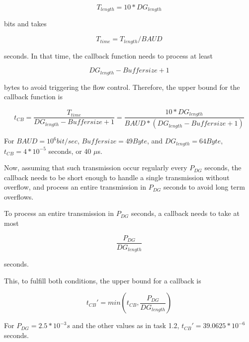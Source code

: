 \documentclass[12pt,a4paper,titlepage,oneside]{article}
\begin{document}
\begin{displaymath}
    T_{length} = 10 * DG_{length}
\end{displaymath}

bits and takes

\begin{displaymath}
    T_{time} = T_{length} / \mathit{BAUD}
\end{displaymath}

seconds.
In that time, the callback function needs to process at least

\begin{displaymath}
    DG_{length} - \mathit{Buffersize} + 1
\end{displaymath}

bytes to avoid triggering the flow control. Therefore, the upper bound for the
callback function is

\begin{displaymath}
    t_{CB} = \frac{T_{time}}{DG_{length} - \mathit{Buffersize} + 1}
           = \frac{10 * DG_{length}}{\mathit{BAUD} * (DG_{length} - \mathit{Buffersize} + 1)}
\end{displaymath}


For $\mathit{BAUD}=10^{6}bit/sec$, $\mathit{Buffersize}=49Byte$, and
$DG_{length}=64Byte$, $t_{CB} = 4 * 10^{-5}$ seconds, or 40 $\mu$s.


Now, assuming that such transmission occur regularly every $P_{DG}$ seconds,
the callback needs to be short enough to handle a single transmission without
overflow, and process an entire transmission in $P_{DG}$ seconds to avoid long
term overflows.

To process an entire transmission in $P_{DG}$ seconds, a callback needs to
take at most

\begin{displaymath}
    \frac{P_{DG}}{DG_{length}}
\end{displaymath}

seconds.

This, to fulfill both conditions, the upper bound for a callback is

\begin{displaymath}
    t_{CB}' = min(t_{CB}, \frac{P_{DG}}{DG_{length}})
\end{displaymath}

For $P_{DG}=2.5*10^{-3}s$ and the other values as in task 1.2, $t_{CB}' = 39.0625 * 10^{-6}$ seconds.
\end{document}
